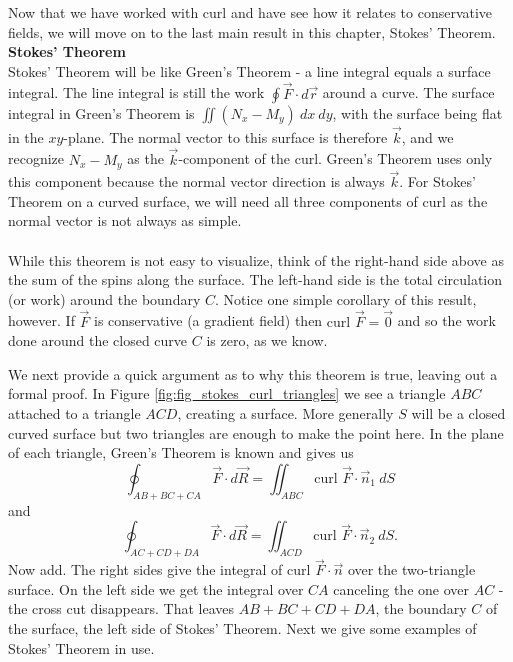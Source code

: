 Now that we have worked with curl and have see how it relates to conservative fields, we will move on to the last main result in this chapter, Stokes' Theorem.\\

\noindent\textbf{\large Stokes' Theorem}\\

Stokes' Theorem will be like Green's Theorem - a line integral equals a surface integral. The line integral is still the work $\displaystyle\oint \vec F \cdot d\vec r$ around a curve.  The surface integral in Green's Theorem is $\displaystyle\iint (N_x - M_y) \: dx \: dy$, with the surface being flat in the $xy$-plane. The normal vector to this surface is therefore $\vec k$, and we recognize $N_x - M_y$ as the $\vec k$-component of the curl.  Green's Theorem uses only this component because the normal vector direction is always $\vec k$.  For Stokes' Theorem on a curved surface, we will need all three components of curl as the normal vector is not always as simple.\\

\\

While this theorem is not easy to visualize, think of the right-hand side above as the sum of the spins along the surface.  The left-hand side is the total circulation (or work) around the boundary $C$.  Notice one simple corollary of this result, however.  If $\vec F$ is conservative (a gradient field) then $\text{curl } \vec F = \vec 0$ and so the work done around the closed curve $C$ is zero, as we know.\\


We next provide a quick argument as to why this theorem is true, leaving out a formal proof.  In Figure \ref{fig:fig_stokes_curl_triangles} we see a triangle $ABC$ attached to a triangle $ACD$, creating a surface.  More generally $S$ will be a closed curved surface but two triangles are enough to make the point here.  In the plane of each triangle, Green's Theorem is known and gives us
$$\oint_{AB+BC+CA} \vec F \cdot d\vec R = \iint_{ABC} \text{curl } \vec F \cdot \vec n_1 \: dS$$
and
$$\oint_{AC+CD+DA} \vec F \cdot d\vec R = \iint_{ACD} \text{curl } \vec F \cdot \vec n_2 \: dS.$$
Now add.  The right sides give the integral of $\text{curl } \vec F \cdot \vec n$ over the two-triangle surface.  On the left side we get the integral over $CA$ canceling the one over $AC$ - the cross cut disappears.  That leaves $AB + BC + CD + DA$, the boundary $C$ of the surface, the left side of Stokes' Theorem. Next we give some examples of Stokes' Theorem in use.\\

